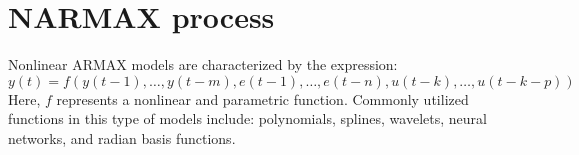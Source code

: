\section{NARMAX process}

Nonlinear ARMAX models are characterized by the expression:
\[y(t)=f\left(y(t-1),\dots,y(t-m),e(t-1),\dots,e(t-n),u(t-k),\dots,u(t-k-p)\right)\]
Here, $f$ represents a nonlinear and parametric function. 
Commonly utilized functions in this type of models include: polynomials, splines, wavelets, neural networks, and radian basis functions. 